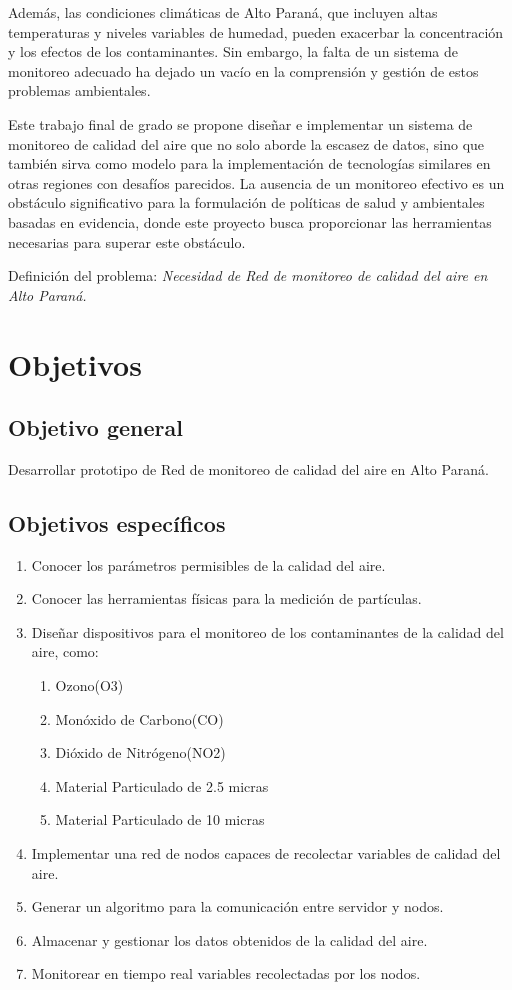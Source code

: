 Además, las condiciones climáticas de Alto Paraná, que incluyen altas temperaturas y niveles variables de humedad, pueden exacerbar la concentración y los efectos de los contaminantes. Sin embargo, la falta de un sistema de monitoreo adecuado ha dejado un vacío en la comprensión y gestión de estos problemas ambientales.

Este trabajo final de grado se propone diseñar e implementar un sistema de monitoreo de calidad del aire que no solo aborde la escasez de datos, sino que también sirva como modelo para la implementación de tecnologías similares en otras regiones con desafíos parecidos. La ausencia de un monitoreo efectivo es un obstáculo significativo para la formulación de políticas de salud y ambientales basadas en evidencia, donde este proyecto busca proporcionar las herramientas necesarias para superar este obstáculo.



Definición del problema: \textit {Necesidad de Red de monitoreo de calidad del aire en Alto Paraná.}

\section{Objetivos}
\subsection{Objetivo general}
Desarrollar prototipo de Red de monitoreo de calidad del aire en Alto Paraná.


\subsection{Objetivos específicos}

\begin{enumerate}
\item Conocer los parámetros permisibles de la calidad del aire.
\item Conocer las herramientas físicas para la medición de partículas.
\item Diseñar dispositivos para el monitoreo de los contaminantes de la calidad del aire, como:
\begin{enumerate}
\item Ozono(O3)
\item Monóxido de Carbono(CO)
\item Dióxido de Nitrógeno(NO2)
\item Material Particulado de 2.5 micras
\item Material Particulado de 10 micras
\end{enumerate}
\item Implementar una red de nodos capaces de recolectar variables de calidad del aire.
\item Generar un algoritmo para la comunicación entre servidor y nodos.
\item Almacenar y gestionar los datos obtenidos de la calidad del aire.
\item Monitorear en tiempo real variables recolectadas por los nodos.
\end{enumerate} \pagebreak


